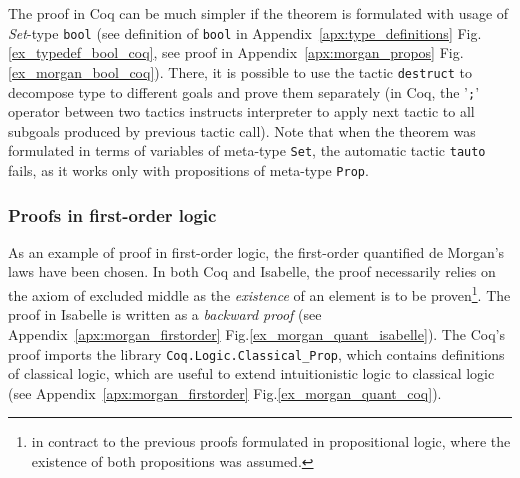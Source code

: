 \documentclass[article]{aaltoseries}
\begin{document}


The proof in Coq can be much simpler if the theorem is formulated with usage of \textit{Set}-type \texttt{bool} (see definition of \texttt{bool} in Appendix~\ref{apx:type_definitions} Fig.\ref{ex_typedef_bool_coq}, see proof in Appendix~\ref{apx:morgan_propos} Fig.\ref{ex_morgan_bool_coq}). There, it is possible to use the tactic \texttt{destruct} to decompose type to different goals and prove them separately (in Coq, the '\texttt{;}' operator between two tactics instructs interpreter to apply next tactic to all subgoals produced by previous tactic call). Note that when the theorem was formulated in terms of variables of meta-type \texttt{Set}, the automatic tactic \texttt{tauto} fails, as it works only with propositions of meta-type \texttt{Prop}.


\subsubsection{Proofs in first-order logic}

As an example of proof in first-order logic, the first-order quantified de Morgan's laws have been chosen. In both Coq and Isabelle, the proof necessarily relies on the axiom of excluded middle as the \textit{existence} of an element is to be proven\footnote{in contract to the previous proofs formulated in propositional logic, where the existence of both propositions was assumed.}. The proof in Isabelle is written as a \textit{backward proof} (see Appendix~\ref{apx:morgan_firstorder} Fig.\ref{ex_morgan_quant_isabelle}). The Coq's proof imports the library \texttt{Coq.Logic.Classical\_Prop}, which contains definitions of classical logic, which are useful to extend intuitionistic logic to classical logic (see Appendix~\ref{apx:morgan_firstorder} Fig.\ref{ex_morgan_quant_coq}).

\end{document}
